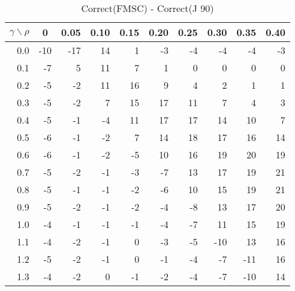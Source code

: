 \documentclass[12pt]{article}
\begin{document}
%

\begin{table}[!tbp]
\caption{Correct(FMSC) - Correct(J 90)}
 \begin{center}
 \begin{tabular}{r|rrrrrrrrr}\hline\hline
\multicolumn{1}{c|}{$\gamma\backslash\rho$}&\multicolumn{1}{c}{0}&\multicolumn{1}{c}{0.05}&\multicolumn{1}{c}{0.10}&\multicolumn{1}{c}{0.15}&\multicolumn{1}{c}{0.20}&\multicolumn{1}{c}{0.25}&\multicolumn{1}{c}{0.30}&\multicolumn{1}{c}{0.35}&\multicolumn{1}{c}{0.40}\tabularnewline
\hline


0.0&-10&-17&14& 1&-3&-4& -4& -4&-3\tabularnewline
0.1& -7&  5&11& 7& 1& 0&  0&  0& 0\tabularnewline
0.2& -5& -2&11&16& 9& 4&  2&  1& 1\tabularnewline
0.3& -5& -2& 7&15&17&11&  7&  4& 3\tabularnewline
0.4& -5& -1&-4&11&17&17& 14& 10& 7\tabularnewline
0.5& -6& -1&-2& 7&14&18& 17& 16&14\tabularnewline
0.6& -6& -1&-2&-5&10&16& 19& 20&19\tabularnewline
0.7& -5& -2&-1&-3&-7&13& 17& 19&21\tabularnewline
0.8& -5& -1&-1&-2&-6&10& 15& 19&21\tabularnewline
0.9& -5& -2&-1&-2&-4&-8& 13& 17&20\tabularnewline
1.0& -4& -1&-1&-1&-4&-7& 11& 15&19\tabularnewline
1.1& -4& -2&-1& 0&-3&-5&-10& 13&16\tabularnewline
1.2& -5& -2&-1& 0&-1&-4& -7&-11&16\tabularnewline
1.3& -4& -2& 0&-1&-2&-4& -7&-10&14\tabularnewline
\hline
\end{tabular}

\end{center}

\end{table}

%
\end{document}
